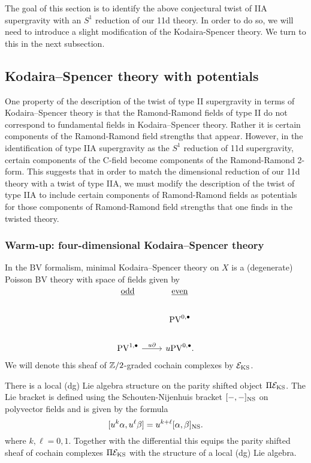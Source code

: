 \documentclass[11pt]{amsart}
\def\PV{{\rm PV}}
\begin{document}
The goal of this section is to identify the above conjectural twist of IIA supergravity with an $S^{1}$ reduction of our 11d theory. In order to do so, we will need to introduce a slight modification of the Kodaira-Spencer theory. We turn to this in the next subsection.

\subsection{Kodaira--Spencer theory with potentials}
\label{KSPot}

One property of the description of the twist of type II supergravity in terms of Kodaira--Spencer theory is that the Ramond-Ramond fields of type II do not correspond to fundamental fields in Kodaira--Spencer theory. Rather it is certain components of the Ramond-Ramond field strengths that appear. However, in the identification of type IIA supergravity as the $S^{1}$ reduction of 11d supergravity, certain components of the C-field become components of the Ramond-Ramond 2-form. This suggests that in order to match the dimensional reduction of our 11d theory with a twist of type IIA, we must modify the description of the twist of type IIA to include certain components of Ramond-Ramond fields as potentials for those components of Ramond-Ramond field strengths that one finds in the twisted theory.

\subsubsection{Warm-up: four-dimensional Kodaira--Spencer theory}
\label{sec:org91dc4ca}
In the BV formalism, minimal Kodaira--Spencer theory on $X$ is a (degenerate) Poisson BV theory with space of fields given by
\[
\begin{tikzcd}
\ul{\rm odd} & \ul{\rm even} \\
 & \PV^{0,\bu} \\
 \PV^{1,\bu} \ar[r, "u \partial"] & u \PV^{0,\bu} .
\end{tikzcd}
\]
We will denote this sheaf of $\mathbb Z /2$-graded cochain complexes by $\mathcal E_{\rm KS}$.

There is a local (dg) Lie algebra structure on the parity shifted object $\Pi \mathcal E_{\rm KS}$.
The Lie bracket is defined using the Schouten-Nijenhuis bracket $[-,-]_{\rm NS}$ on polyvector fields and is given by the formula
\[
[u^k \alpha , u^\ell \beta] = u^{k+\ell} [\alpha, \beta]_{\rm NS} .
\]
where $k, \ell = 0,1$.
Together with the differential this equips the parity shifted sheaf of cochain complexes $\Pi \mathcal E_{\rm KS}$ with the structure of a local (dg) Lie algebra.
\end{document}
